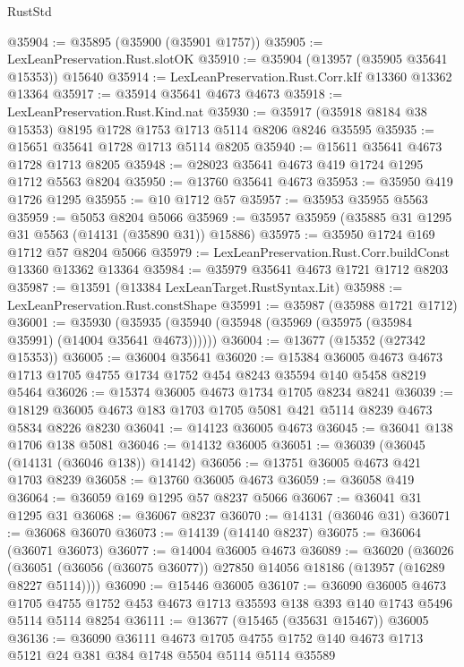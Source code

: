\begin{lexlean}{RustStd}
\begin{coremodule}
@35904 := @35895 (@35900 (@35901 @1757))
@35905 := LexLeanPreservation.Rust.slotOK
@35910 := @35904 (@13957 (@35905 @35641 @15353)) @15640
@35914 := LexLeanPreservation.Rust.Corr.kIf @13360 @13362 @13364
@35917 := @35914 @35641 @4673 @4673
@35918 := LexLeanPreservation.Rust.Kind.nat
@35930 := @35917 (@35918 @8184 @38 @15353) @8195 @1728 @1753 @1713 @5114 @8206 @8246 @35595
@35935 := @15651 @35641 @1728 @1713 @5114 @8205
@35940 := @15611 @35641 @4673 @1728 @1713 @8205
@35948 := @28023 @35641 @4673 @419 @1724 @1295 @1712 @5563 @8204
@35950 := @13760 @35641 @4673
@35953 := @35950 @419 @1726 @1295
@35955 := @10 @1712 @57
@35957 := @35953 @35955 @5563
@35959 := @5053 @8204 @5066
@35969 := @35957 @35959 (@35885 @31 @1295 @31 @5563 (@14131 (@35890 @31)) @15886)
@35975 := @35950 @1724 @169 @1712 @57 @8204 @5066
@35979 := LexLeanPreservation.Rust.Corr.buildConst @13360 @13362 @13364
@35984 := @35979 @35641 @4673 @1721 @1712 @8203
@35987 := @13591 (@13384 LexLeanTarget.RustSyntax.Lit)
@35988 := LexLeanPreservation.Rust.constShape
@35991 := @35987 (@35988 @1721 @1712)
@36001 := @35930 (@35935 (@35940 (@35948 (@35969 (@35975 (@35984 @35991) (@14004 @35641 @4673))))))
@36004 := @13677 (@15352 (@27342 @15353))
@36005 := @36004 @35641
@36020 := @15384
    @36005
    @4673
    @4673
    @1713
    @1705
    @4755
    @1734
    @1752
    @454
    @8243
    @35594
    @140
    @5458
    @8219
    @5464
@36026 := @15374 @36005 @4673 @1734 @1705 @8234 @8241
@36039 := @18129 @36005 @4673 @183 @1703 @1705 @5081 @421 @5114 @8239 @4673 @5834 @8226 @8230
@36041 := @14123 @36005 @4673
@36045 := @36041 @138 @1706 @138 @5081
@36046 := @14132 @36005
@36051 := @36039 (@36045 (@14131 (@36046 @138)) @14142)
@36056 := @13751 @36005 @4673 @421 @1703 @8239
@36058 := @13760 @36005 @4673
@36059 := @36058 @419
@36064 := @36059 @169 @1295 @57 @8237 @5066
@36067 := @36041 @31 @1295 @31
@36068 := @36067 @8237
@36070 := @14131 (@36046 @31)
@36071 := @36068 @36070
@36073 := @14139 (@14140 @8237)
@36075 := @36064 (@36071 @36073)
@36077 := @14004 @36005 @4673
@36089 := @36020
    (@36026 (@36051 (@36056 (@36075 @36077)) @27850 @14056 @18186 (@13957 (@16289 @8227 @5114))))
@36090 := @15446 @36005
@36107 := @36090
    @36005
    @4673
    @1705
    @4755
    @1752
    @453
    @4673
    @1713
    @35593
    @138
    @393
    @140
    @1743
    @5496
    @5114
    @5114
    @8254
@36111 := @13677 (@15465 (@35631 @15467)) @36005
@36136 := @36090
    @36111
    @4673
    @1705
    @4755
    @1752
    @140
    @4673
    @1713
    @5121
    @24
    @381
    @384
    @1748
    @5504
    @5114
    @5114
    @35589

\end{coremodule}
\end{lexlean}
